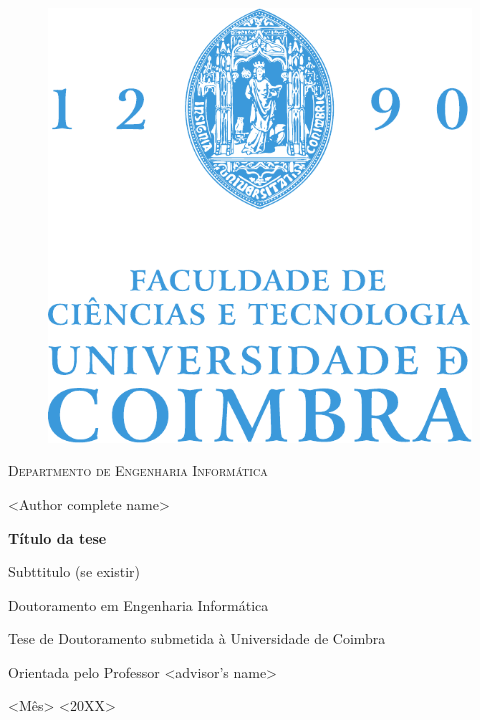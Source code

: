 \thispagestyle{empty}

\mbox{}
\vspace{1cm}

\begin{center}

\begin{figure}[h!]
	\begin{center}
	\includegraphics[width=0.35\linewidth]{frontmatter/FCTUC_logo.pdf}	
	\end{center}
\end{figure}

\small
\textsc{Departmento de Engenharia Informática}


\vspace{1.5cm}


\Large
<Author complete name>

\vspace{2cm}

\Huge
\textbf{\textsf{Título da tese}}

\LARGE
\textsf{Subttitulo (se existir)}

\vspace{3cm}

\normalsize

Doutoramento em Engenharia Informática

Tese de Doutoramento submetida à Universidade de Coimbra

Orientada pelo Professor <advisor's name>

\vspace{1.5cm}

<Mês> <20XX>


\end{center}

